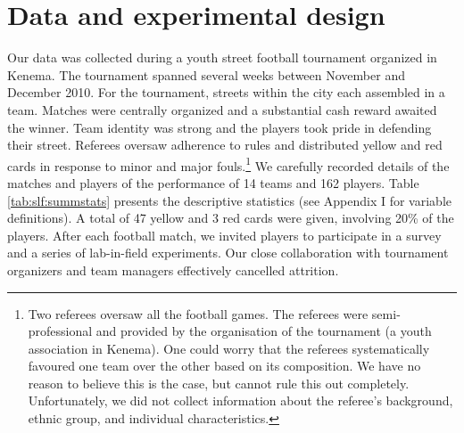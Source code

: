 \section{Data and experimental design}
\label{sec:slf:data}
Our data was collected during a youth street football tournament organized in Kenema. The tournament spanned several weeks between November and December 2010. For the tournament, streets within the city each assembled in a team. Matches were centrally organized and a substantial cash reward awaited the winner. Team identity was strong and the players took pride in defending their street. Referees oversaw adherence to rules and distributed yellow and red cards in response to minor and major fouls.\footnote{Two referees oversaw all the football games. The referees were semi-professional and provided by the organisation of the tournament (a youth association in Kenema). One could worry that the referees systematically favoured one team over the other based on its composition. We have no reason to believe this is the case, but cannot rule this out completely. Unfortunately, we did not collect information about the referee’s background, ethnic group, and individual characteristics.}  We carefully recorded details of the matches and players of the performance of 14 teams and 162 players.  Table \ref{tab:slf:summstats} presents the descriptive statistics (see Appendix I for variable definitions). A total of 47 yellow and 3 red cards were given, involving 20\% of the players. After each football match, we invited players to participate in a survey and a series of lab-in-field experiments. Our close collaboration with tournament organizers and team managers effectively cancelled attrition. 

